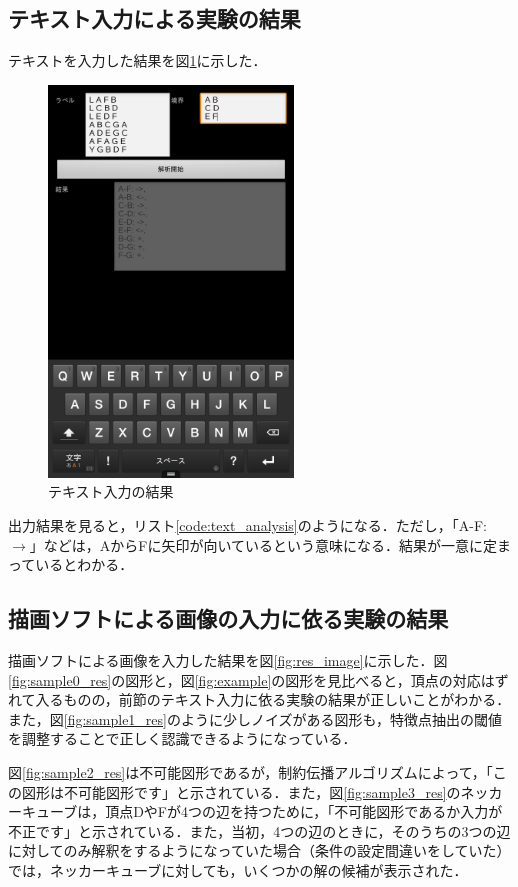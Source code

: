 \documentclass{jarticle}
\begin{document}
\subsection{テキスト入力による実験の結果}
テキストを入力した結果を図\ref{fig:res_text}に示した．
\begin{figure}[H]
\begin{center}
\includegraphics[width=65mm]{../play_store/text_analysis.png}
\caption{テキスト入力の結果}
\label{fig:res_text}
\end{center}
\end{figure}

出力結果を見ると，リスト\ref{code:text_analysis}のようになる．ただし，「A-F: $\rightarrow$」などは，AからFに矢印が向いているという意味になる．結果が一意に定まっているとわかる．
\lstset{style=customplain}




\subsection{描画ソフトによる画像の入力に依る実験の結果}
描画ソフトによる画像を入力した結果を図\ref{fig:res_image}に示した．図\ref{fig:sample0_res}の図形と，図\ref{fig:example}の図形を見比べると，頂点の対応はずれて入るものの，前節のテキスト入力に依る実験の結果が正しいことがわかる．また，図\ref{fig:sample1_res}のように少しノイズがある図形も，特徴点抽出の閾値を調整することで正しく認識できるようになっている．

図\ref{fig:sample2_res}は不可能図形であるが，制約伝播アルゴリズムによって，「この図形は不可能図形です」と示されている．また，図\ref{fig:sample3_res}のネッカーキューブは，頂点DやFが4つの辺を持つために，「不可能図形であるか入力が不正です」と示されている．また，当初，4つの辺のときに，そのうちの3つの辺に対してのみ解釈をするようになっていた場合（条件の設定間違いをしていた）では，ネッカーキューブに対しても，いくつかの解の候補が表示された．
\end{document}
